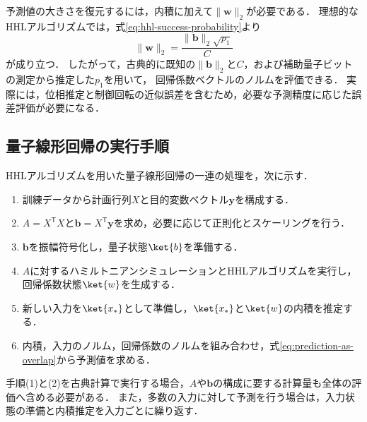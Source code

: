 予測値の大きさを復元するには，内積に加えて$\|\bm{w}\|_2$が必要である．
理想的なHHLアルゴリズムでは，式\eqref{eq:hhl-success-probability}より
\begin{equation}
  \|\bm{w}\|_2
  =
  \frac{\|\bm{b}\|_2\sqrt{p_1}}{C}
  \label{eq:coefficient-norm-from-success-probability}
\end{equation}
が成り立つ．
したがって，古典的に既知の$\|\bm{b}\|_2$と$C$，および補助量子ビットの測定から推定した$p_1$を用いて，
回帰係数ベクトルのノルムを評価できる．
実際には，位相推定と制御回転の近似誤差を含むため，必要な予測精度に応じた誤差評価が必要になる．

\subsection{量子線形回帰の実行手順}
\label{subsec:quantum-linear-regression-procedure}

HHLアルゴリズムを用いた量子線形回帰の一連の処理を，次に示す．

\begin{enumerate}[(1)]
  \item 訓練データから計画行列$X$と目的変数ベクトル$\bm{y}$を構成する．
  \item $A=X^{\mathsf{T}}X$と$\bm{b}=X^{\mathsf{T}}\bm{y}$を求め，必要に応じて正則化とスケーリングを行う．
  \item $\bm{b}$を振幅符号化し，量子状態$\ket{b}$を準備する．
  \item $A$に対するハミルトニアンシミュレーションとHHLアルゴリズムを実行し，回帰係数状態$\ket{w}$を生成する．
  \item 新しい入力を$\ket{x_{*}}$として準備し，$\ket{x_{*}}$と$\ket{w}$の内積を推定する．
  \item 内積，入力のノルム，回帰係数のノルムを組み合わせ，式\eqref{eq:prediction-as-overlap}から予測値を求める．
\end{enumerate}

手順(1)と(2)を古典計算で実行する場合，$A$や$\bm{b}$の構成に要する計算量も全体の評価へ含める必要がある．
また，多数の入力に対して予測を行う場合は，入力状態の準備と内積推定を入力ごとに繰り返す．
